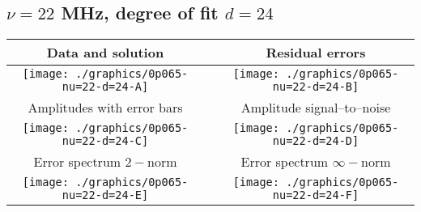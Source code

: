 

% 

\clearpage{}
\break{}

\subsection{$\nu = 22$ MHz, degree of fit $d = 24$}

\begin{table}[h]
    \begin{center}
        \begin{tabular}{ccc}
            Data and solution & \quad & Residual errors \\\hline
            \texttt{[image: ./graphics/0p065-nu=22-d=24-A]} &&
            \texttt{[image: ./graphics/0p065-nu=22-d=24-B]} \\[15pt]
            Amplitudes with error bars && Amplitude signal--to--noise \\\hline
            \texttt{[image: ./graphics/0p065-nu=22-d=24-C]} &&
            \texttt{[image: ./graphics/0p065-nu=22-d=24-D]} \\[15pt]
            Error spectrum $2-$norm && Error spectrum $\infty-$norm \\\hline
            \texttt{[image: ./graphics/0p065-nu=22-d=24-E]} &&
            \texttt{[image: ./graphics/0p065-nu=22-d=24-F]} \\[15pt]
        \end{tabular}
    \end{center}
\label{fig:elev=65, nu=22}
\end{table}



\endinput
